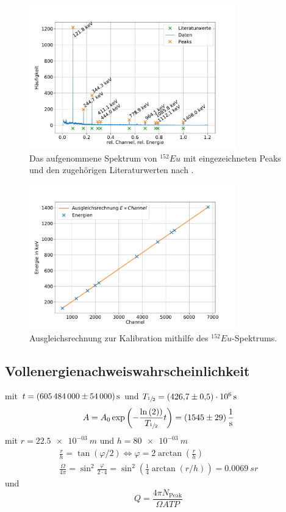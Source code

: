 \begin{figure}[h!]
  \centering
  \includegraphics[width=0.8\textwidth]{content/images/spektrum_europium_kali.pdf}
  \caption{Das aufgenommene Spektrum von $^{152}Eu$ mit eingezeichneten Peaks und den zugehörigen Literaturwerten nach %
  .}
  \label{fig:eu_spect_kali}
\end{figure}

\begin{figure}[h!]
  \centering
  \includegraphics[width=0.8\textwidth]{content/images/kalibration.pdf}
  \caption{Ausgleichsrechnung zur Kalibration mithilfe des $^{152}Eu$-Spektrums.}
  \label{fig:kali}
\end{figure}


\subsection{Vollenergienachweiswahrscheinlichkeit}
mit $t = \SI{605484000 (54000)}{s}$
und $T_{\sfrac{1}{2}} = \SI{426.7 (5) e+06}{s}$ %
\begin{equation*}
	A = A_{0} \exp{\left( - \frac{\ln{(2))}}{T_{\sfrac{1}{2}}} t \right)} = \SI{1545(29)}{\per \second}
\end{equation*}
mit $r=\SI{22.5e-03}{m}$
und $h = \SI{80e-03}{m}$
\begin{align*}
	\frac{r}{h} = \tan{( \varphi / 2 )} \Leftrightarrow \varphi = 2 \arctan{(\frac{r}{h})} \\
	\frac{\Omega}{4 \pi} = \sin^2{\frac{\varphi}{2 \cdot 4}} =  \sin^2{ \left( \frac{1}{4} \arctan{(r/h)} \right)} = \SI{0.0069}{sr}
\end{align*}
und
\begin{equation}
	Q = \frac{4 \pi N_{\text{Peak}}}{\Omega A T P}
\end{equation}
